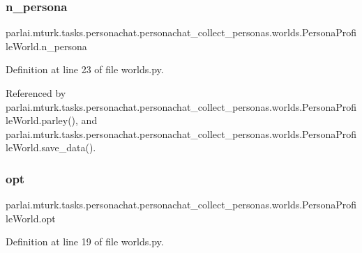 \subsubsection{\texorpdfstring{n\+\_\+persona}{n\_persona}}
{\footnotesize\ttfamily parlai.\+mturk.\+tasks.\+personachat.\+personachat\+\_\+collect\+\_\+personas.\+worlds.\+Persona\+Profile\+World.\+n\+\_\+persona}



Definition at line 23 of file worlds.\+py.



Referenced by parlai.\+mturk.\+tasks.\+personachat.\+personachat\+\_\+collect\+\_\+personas.\+worlds.\+Persona\+Profile\+World.\+parley(), and parlai.\+mturk.\+tasks.\+personachat.\+personachat\+\_\+collect\+\_\+personas.\+worlds.\+Persona\+Profile\+World.\+save\+\_\+data().

\mbox{\label{classparlai_1_1mturk_1_1tasks_1_1personachat_1_1personachat__collect__personas_1_1worlds_1_1PersonaProfileWorld_aacd506fe7f9a62c37a109a8896e6ddca}} 
\subsubsection{\texorpdfstring{opt}{opt}}
{\footnotesize\ttfamily parlai.\+mturk.\+tasks.\+personachat.\+personachat\+\_\+collect\+\_\+personas.\+worlds.\+Persona\+Profile\+World.\+opt}



Definition at line 19 of file worlds.\+py.



